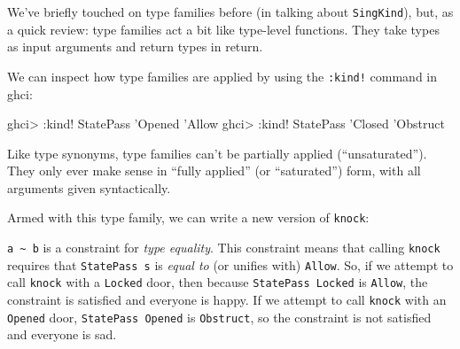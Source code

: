 \documentclass[]{article}
\newenvironment{Shaded}{}{}
\newcommand{\CommentTok}[1]{\textcolor[rgb]{0.38,0.63,0.69}{\textit{#1}}}
\newcommand{\DataTypeTok}[1]{\textcolor[rgb]{0.56,0.13,0.00}{#1}}
\newcommand{\FunctionTok}[1]{\textcolor[rgb]{0.02,0.16,0.49}{#1}}
\newcommand{\NormalTok}[1]{#1}
\newcommand{\OtherTok}[1]{\textcolor[rgb]{0.00,0.44,0.13}{#1}}
\newcommand{\StringTok}[1]{\textcolor[rgb]{0.25,0.44,0.63}{#1}}
\begin{document}
We've briefly touched on type families before (in talking about
\texttt{SingKind}), but, as a quick review: type families act a bit like
type-level functions. They take types as input arguments and return types in
return.

We can inspect how type families are applied by using the \texttt{:kind!}
command in ghci:

\begin{Shaded}
\begin{Highlighting}[]
\NormalTok{ghci}\FunctionTok{>} \FunctionTok{:}\NormalTok{kind}\FunctionTok{!} \DataTypeTok{StatePass}\NormalTok{ '}\DataTypeTok{Opened}
\NormalTok{'}\DataTypeTok{Allow}
\NormalTok{ghci}\FunctionTok{>} \FunctionTok{:}\NormalTok{kind}\FunctionTok{!} \DataTypeTok{StatePass}\NormalTok{ '}\DataTypeTok{Closed}
\NormalTok{'}\DataTypeTok{Obstruct}
\end{Highlighting}
\end{Shaded}

Like type synonyms, type families can't be partially applied (``unsaturated'').
They only ever make sense in ``fully applied'' (or ``saturated'') form, with all
arguments given syntactically.

Armed with this type family, we can write a new version of \texttt{knock}:

\begin{Shaded}
\end{Shaded}

\texttt{a\ \textasciitilde{}\ b} is a constraint for \emph{type equality}. This
constraint means that calling \texttt{knock} requires that \texttt{StatePass\ s}
is \emph{equal to} (or unifies with) \texttt{\textquotesingle{}Allow}. So, if we
attempt to call \texttt{knock} with a \texttt{\textquotesingle{}Locked} door,
then because \texttt{StatePass\ \textquotesingle{}Locked} is
\texttt{\textquotesingle{}Allow}, the constraint is satisfied and everyone is
happy. If we attempt to call \texttt{knock} with an
\texttt{\textquotesingle{}Opened} door,
\texttt{StatePass\ \textquotesingle{}Opened} is
\texttt{\textquotesingle{}Obstruct}, so the constraint is not satisfied and
everyone is sad.
\end{document}
